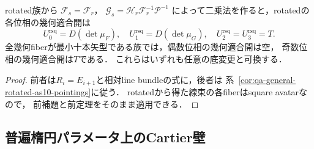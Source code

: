 \begin{corollary}[Rotated族と最小十本矢族の開部分]
\label{cor:qa-relative-rotated-as10-open}
rotated族から
$\mathcal F_s=\mathcal F_r$，
$\mathcal G_s=\mathcal H_r\mathcal F_r^{-1}\mathcal P^{-1}$
によって二乗法を作ると，rotatedの各位相の幾何適合開は
\[
 U^{\mathrm{rsq}}_0=D(\det\mu_F),\quad
 U^{\mathrm{rsq}}_1=D(\det\mu_G),\quad
 U^{\mathrm{rsq}}_2=U^{\mathrm{rsq}}_3=T.
\]
全幾何fiberが最小十本矢型である族では，偶数位相の幾何適合開は空，
奇数位相の幾何適合開は$T$である．
これらはいずれも任意の底変更と可換する．
\end{corollary}
\begin{proof}
前者は$R_i=E_{i+1}$と相対line bundleの式に，後者は
系~\ref{cor:qa-general-rotated-as10-pointings}に従う．
rotatedから得た線束の各fiberはsquare avatarなので，
前補題と前定理をそのまま適用できる．
\end{proof}

\subsection{普遍楕円パラメータ上のCartier壁}

